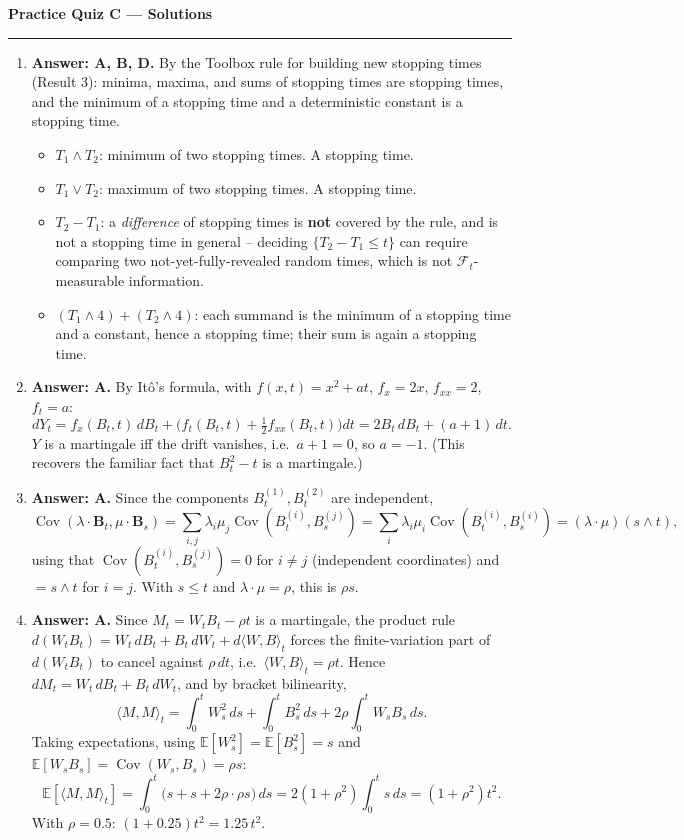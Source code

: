 \documentclass[11pt]{article}
\newcommand{\E}{\mathbb{E}}
\DeclareMathOperator{\Cov}{Cov}
\newcommand{\ans}[1]{\par\noindent\textbf{\color{blue!50!black}Answer: #1}}
\begin{document}
\begin{center}
{\LARGE\bfseries Practice Quiz C --- Solutions}
\end{center}
\vspace{6pt}
\hrule
\vspace{10pt}

\begin{enumerate}

\item[\textbf{Q1.}] \ans{A, B, D.} By the Toolbox rule for building new stopping times (Result 3): minima, maxima, and sums of stopping times are stopping times, and the minimum of a stopping time and a deterministic constant is a stopping time.
\begin{itemize}[nosep]
\item[A] $T_1\wedge T_2$: minimum of two stopping times. A stopping time.
\item[B] $T_1\vee T_2$: maximum of two stopping times. A stopping time.
\item[C] $T_2-T_1$: a \emph{difference} of stopping times is \textbf{not} covered by the rule, and is not a stopping time in general -- deciding $\{T_2-T_1\le t\}$ can require comparing two not-yet-fully-revealed random times, which is not $\mathcal F_t$-measurable information.
\item[D] $(T_1\wedge4)+(T_2\wedge4)$: each summand is the minimum of a stopping time and a constant, hence a stopping time; their sum is again a stopping time.
\end{itemize}

\item[\textbf{Q2.}] \ans{A.} By It\^o's formula, with $f(x,t)=x^2+at$, $f_x=2x$, $f_{xx}=2$, $f_t=a$:
\[
dY_t=f_x(B_t,t)\,dB_t+\Big(f_t(B_t,t)+\tfrac12f_{xx}(B_t,t)\Big)dt=2B_t\,dB_t+(a+1)\,dt.
\]
$Y$ is a martingale iff the drift vanishes, i.e.\ $a+1=0$, so $a=-1$. (This recovers the familiar fact that $B_t^2-t$ is a martingale.)

\item[\textbf{Q3.}] \ans{A.} Since the components $B_t^{(1)},B_t^{(2)}$ are independent,
\[
\Cov(\lambda\cdot\boldsymbol B_t,\mu\cdot\boldsymbol B_s)=\sum_{i,j}\lambda_i\mu_j\Cov(B_t^{(i)},B_s^{(j)})=\sum_i\lambda_i\mu_i\Cov(B_t^{(i)},B_s^{(i)})=(\lambda\cdot\mu)(s\wedge t),
\]
using that $\Cov(B_t^{(i)},B_s^{(j)})=0$ for $i\ne j$ (independent coordinates) and $=s\wedge t$ for $i=j$. With $s\le t$ and $\lambda\cdot\mu=\rho$, this is $\rho s$.

\item[\textbf{Q4.}] \ans{A.} Since $M_t=W_tB_t-\rho t$ is a martingale, the product rule $d(W_tB_t)=W_t\,dB_t+B_t\,dW_t+d\langle W,B\rangle_t$ forces the finite-variation part of $d(W_tB_t)$ to cancel against $\rho\,dt$, i.e.\ $\langle W,B\rangle_t=\rho t$. Hence $dM_t=W_t\,dB_t+B_t\,dW_t$, and by bracket bilinearity,
\[
\langle M,M\rangle_t=\int_0^tW_s^2\,ds+\int_0^tB_s^2\,ds+2\rho\int_0^tW_sB_s\,ds.
\]
Taking expectations, using $\E[W_s^2]=\E[B_s^2]=s$ and $\E[W_sB_s]=\Cov(W_s,B_s)=\rho s$:
\[
\E[\langle M,M\rangle_t]=\int_0^t\big(s+s+2\rho\cdot\rho s\big)\,ds=2(1+\rho^2)\int_0^ts\,ds=(1+\rho^2)t^2.
\]
With $\rho=0.5$: $(1+0.25)t^2=1.25\,t^2$.


\end{enumerate}
\end{document}
